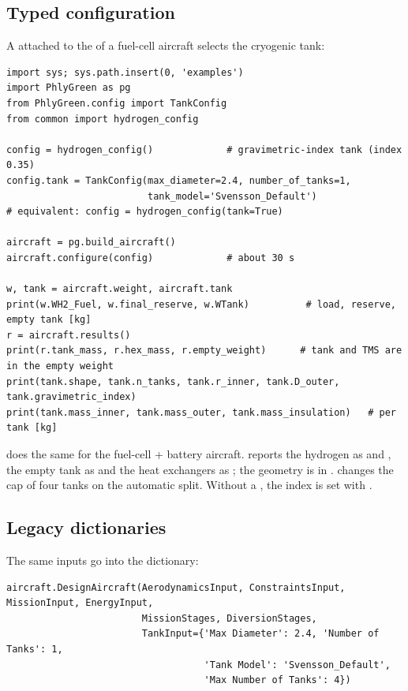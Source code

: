 \documentclass[a4paper,11pt]{article}
\begin{document}
\subsection{Typed configuration}
A  attached to the  of a fuel-cell aircraft selects the
cryogenic tank:
\begin{lstlisting}
import sys; sys.path.insert(0, 'examples')
import PhlyGreen as pg
from PhlyGreen.config import TankConfig
from common import hydrogen_config

config = hydrogen_config()             # gravimetric-index tank (index 0.35)
config.tank = TankConfig(max_diameter=2.4, number_of_tanks=1,
                         tank_model='Svensson_Default')
# equivalent: config = hydrogen_config(tank=True)

aircraft = pg.build_aircraft()
aircraft.configure(config)             # about 30 s

w, tank = aircraft.weight, aircraft.tank
print(w.WH2_Fuel, w.final_reserve, w.WTank)          # load, reserve, empty tank [kg]
r = aircraft.results()
print(r.tank_mass, r.hex_mass, r.empty_weight)      # tank and TMS are in the empty weight
print(tank.shape, tank.n_tanks, tank.r_inner, tank.D_outer, tank.gravimetric_index)
print(tank.mass_inner, tank.mass_outer, tank.mass_insulation)   # per tank [kg]
\end{lstlisting}
 does the same for the fuel-cell + battery aircraft.
 reports the hydrogen as  and , the empty
tank as  and the heat exchangers as ; the geometry is in
.  changes the cap of four tanks
on the automatic split. Without a , the index is set with
.

\subsection{Legacy dictionaries}
The same inputs go into the  dictionary:
\begin{lstlisting}
aircraft.DesignAircraft(AerodynamicsInput, ConstraintsInput, MissionInput, EnergyInput,
                        MissionStages, DiversionStages,
                        TankInput={'Max Diameter': 2.4, 'Number of Tanks': 1,
                                   'Tank Model': 'Svensson_Default',
                                   'Max Number of Tanks': 4})
\end{lstlisting}
\end{document}
